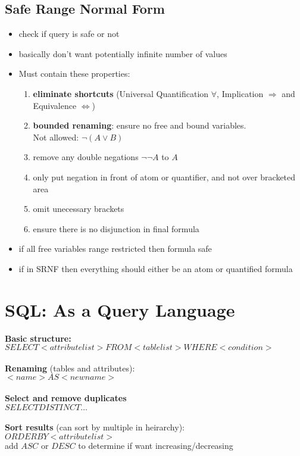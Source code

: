 \documentclass{article}
\newcommand\tab[1][0.5cm]{\hspace*{#1}}
\begin{document}
	\subsection{Safe Range Normal Form}
		\begin{itemize}
			\item check if query is safe or not
			\item basically don't want potentially infinite number of values

			\item Must contain these properties:
				\begin{enumerate}
					\item \textbf{eliminate shortcuts} (Universal Quantification $\forall$, Implication $\Rightarrow$ and Equivalence $\Leftrightarrow$)
					\item \textbf{bounded renaming}: ensure no free and bound variables.\\ \tab Not allowed: $\neg (A \vee B)$
					\item remove any double negations $\neg \neg A$ to $A$
					\item only put negation in front of atom or quantifier, and not over bracketed area
					\item omit unecessary brackets
					\item ensure there is no disjunction in final formula
				\end{enumerate}

			\item if all free variables range restricted then formula safe
			\item if in SRNF then everything should either be an atom or quantified formula
		\end{itemize}



\section{SQL: As a Query Language}
	\textbf{Basic structure:}
		\\\tab$SELECT <attribute list> FROM <table list> WHERE <condition>$
	\\\\\textbf{Renaming} (tables and attributes):
		\\\tab$<name> AS <new name>$
	\\\\\textbf{Select and remove duplicates}
		\\\tab$SELECT DISTINCT \dots$
	\\\\\textbf{Sort results} (can sort by multiple in heirarchy):
		\\\tab $ORDER BY <attribute list>$
		\\\tab add $ASC$ or $DESC$ to determine if want increasing/decreasing
\end{document}
